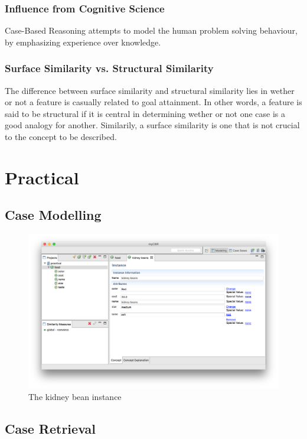\documentclass[paper=a4, fontsize=11pt]{scrartcl} %
\numberwithin{equation}{section} %
\numberwithin{figure}{section} %
\numberwithin{table}{section} %
\begin{document}
\subsubsection{Influence from Cognitive Science}

Case-Based Reasoning attempts to model the human problem solving behaviour, by emphasizing experience over knowledge.

\subsubsection{Surface Similarity vs. Structural Similarity}

The difference between surface similarity and structural similarity lies in wether or not a feature is casually related to goal attainment.
In other words, a feature is said to be structural if it is central in determining wether or not one case is a good analogy for another.
Similarily, a surface similarity is one that is not crucial to the concept to be described.

\section{Practical}

\subsection{Case Modelling}

\begin{figure}[H]
    \centering
    \includegraphics[width=\linewidth]{img/instance.png}
    \caption{The kidney bean instance} \label{fig:instance}
\end{figure}

\subsection{Case Retrieval}
\end{document}
